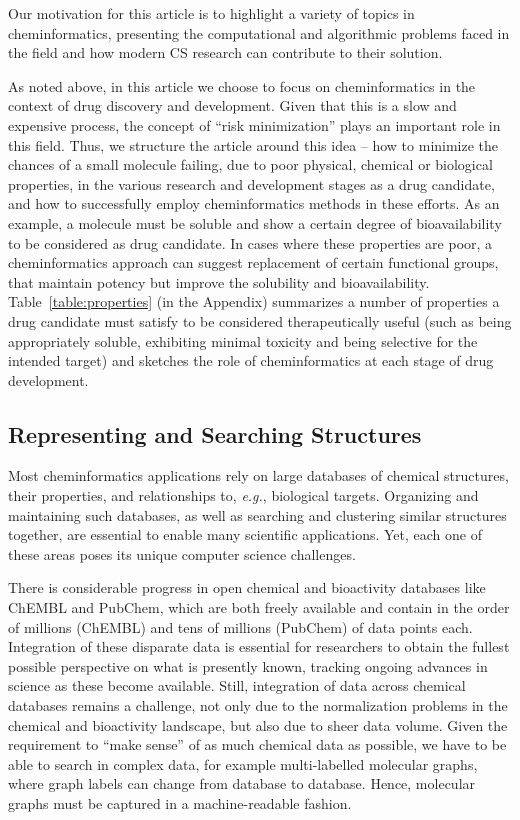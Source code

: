 \documentclass{sig-alternate}
\begin{document}
Our motivation for this article is to highlight a variety of topics in
cheminformatics, presenting the computational and algorithmic problems
faced in the field and how modern CS research can contribute to their
solution.

As noted above, in this article we choose to focus on cheminformatics
in the context of drug discovery and development. Given that this is a
slow and expensive process, the concept of ``risk minimization'' plays
an important role in this field. Thus, we structure the article around
this idea -- how to minimize the chances of a small
molecule failing, due to poor physical, chemical or biological
properties, in the various research and development stages as a drug
candidate, and how to successfully employ cheminformatics methods in
these efforts. As an example, a molecule must be soluble and show a
certain degree of bioavailability to be considered as drug
candidate. In cases where these properties are poor, a cheminformatics
approach can suggest replacement of certain functional groups, that
maintain potency but improve the solubility and bioavailability.
Table~\ref{table:properties} (in the Appendix) summarizes a number of
properties a drug candidate must satisfy to be considered
therapeutically useful (such as being appropriately soluble,
exhibiting minimal toxicity and being selective for the intended
target) and sketches the role of cheminformatics at each stage of drug
development.
%
\subsection{Representing and Searching Structures}
\label{sec:databases}
%
Most cheminformatics applications rely on large databases of chemical
structures, their properties, and relationships to, \textit{e.g.},
biological targets.  Organizing and maintaining such databases, as
well as searching and clustering similar structures together, are
essential to enable many scientific applications. Yet, each one of
these areas poses its unique computer science challenges.

There is considerable progress in open chemical and bioactivity
databases like ChEMBL and PubChem, which are both freely
available and contain in the order of millions (ChEMBL) and tens of
millions (PubChem) of data points each. Integration of these disparate
data is essential for researchers to obtain the fullest possible 
perspective on what is presently known, tracking ongoing advances in 
science as these become available. Still, integration of data
across chemical databases remains a challenge, not only due
to the normalization problems in the chemical and bioactivity
landscape, but also due to sheer data volume. 
Given the requirement to ``make sense'' of as much chemical data 
as possible, we have to be able to search in complex data, for
example multi-labelled molecular graphs, where graph labels can change
from database to database. Hence, molecular graphs must be captured 
in a machine-readable fashion. 
\end{document}
